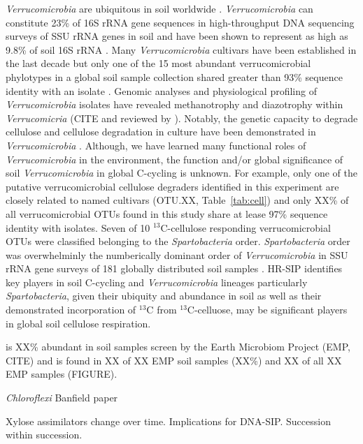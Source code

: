 \textit{Verrucomicrobia} are ubiquitous in soil worldwide
\citep{Bergmann_2011}.  \textit{Verrucomicrobia} can constitute 23\% of 16S
rRNA gene sequences in high-throughput DNA sequencing surveys of SSU rRNA genes
in soil \citep{Bergmann_2011} and have been shown to represent as high as 9.8\%
of soil 16S rRNA \citep{Buckley_2001}. Many \textit{Verrucomicrobia} cultivars
have been established in the last decade \cite{Wertz_2011} but only one of the
15 most abundant verrucomicrobial phylotypes in a global soil sample collection
shared greater than 93\% sequence identity with an isolate
\citep{Bergmann_2011}.  Genomic analyses and physiological profiling of
\textit{Verrucomicrobia} isolates have revealed methanotrophy and diazotrophy
\citep{Wertz_2011} within \textit{Verrucomicria} (CITE and reviewed by
\citet{Wertz_2011}). Notably, the genetic capacity to degrade cellulose and
cellulose degradation in culture have been demonstrated in
\textit{Verrucomicrobia} \citep{Otsuka_2012, Wertz_2011}.  Although, we have
learned many functional roles of \textit{Verrucomicrobia} in the environment,
the function and/or global significance of soil \textit{Verrucomicrobia} in
global C-cycling is unknown. For example, only one of the putative
verrucomicrobial cellulose degraders identified in this experiment are closely
related to named cultivars (OTU.XX, Table~\ref{tab:cell}) and only XX\% of all
verrucomicrobial OTUs found in this study share at lease 97\% sequence identity
with isolates. Seven of 10 $^{13}$C-cellulose responding verrucomicrobial OTUs were
classified belonging to the \textit{Spartobacteria} order.  \textit{Spartobacteria}
order was overwhelminly the numberically dominant order of \textit{Verrucomicrobia} in
SSU rRNA gene surveys of 181 globally distributed soil samples
\citep{Bergmann_2011}. HR-SIP identifies key players in soil C-cycling and
\textit{Verrucomicrobia} lineages particularly \textit{Spartobacteria}, given
their ubiquity and abundance in soil as well as their demonstrated
incorporation of $^{13}$C from $^{13}$C-celluose, may be significant players in
global soil cellulose respiration. 

is XX\% abundant in soil samples screen by the Earth Microbiom Project (EMP, CITE) and is
found in XX of XX EMP soil samples (XX\%) and XX of all XX EMP samples (FIGURE). 

\textit{Chloroflexi} Banfield paper

Xylose assimilators change over time. Implications for DNA-SIP. Succession within succession.

